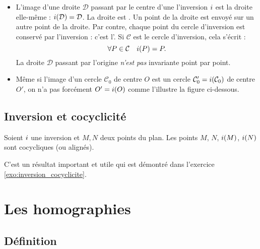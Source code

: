 \documentclass[11pt,class=report,crop=false]{standalone}
\begin{document}
\begin{remarque*}
\sauteligne
\begin{itemize}
 \item L'image d'une droite $\mathcal{D}$ passant par le centre d'une l'inversion $i$ est la droite elle-même :
 $i(\mathcal{D})=\mathcal{D}$. La droite est . Un point de la droite
 est envoyé sur un autre point de la droite.
 Par contre, chaque point du cercle d'inversion est conservé par l'inversion : c'est l'.
 Si $\mathcal{C}$ est le cercle d'inversion, cela s'écrit :
 $$\forall P \in \mathcal{C} \quad i(P)=P.$$
 La droite $\mathcal{D}$ passant par l'origine \emph{n'est pas} invariante point par point.
 
 \item Même si l'image d'un cercle $\mathcal{C}_0$ de centre $O$ est un cercle $\mathcal{C}_0' = i(\mathcal{C}_0)$ de centre $O'$, on n'a pas forcément $O' = i(O)$ comme l'illustre la figure ci-dessous.
 
\end{itemize}
\end{remarque*}




\subsection{Inversion et cocyclicité}


\begin{proposition}
\label{prop:cocycl}
Soient $i$ une inversion et $M, N$ deux points du plan.
Les points $M$, $N$, $i(M)$, $i(N)$ sont cocycliques (ou alignés).
\end{proposition}

C'est un résultat important et utile qui est démontré dans l'exercice \ref{exo:inversion_cocyclicite}.


\section{Les homographies}

\subsection{Définition}
\end{document}
